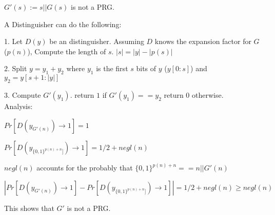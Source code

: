 \documentclass[12pt]{article}
\newenvironment{question}[2][Question]{\begin{trivlist}
		\item[\hskip \labelsep {\bfseries #1}\hskip \labelsep {\bfseries #2.}]}{\end{trivlist}}
\begin{document}
	\begin{question}{2a}
		$G'(s) := s||G(s)$ is not a PRG. 
		
		A Distinguisher can do the following:
		
		\hspace{\parindent} 1. Let $D(y)$ be an distinguisher. Assuming $D$ knows the expansion factor for $G$ ($p(n)$), Compute the length of $s$. $|s|=|y|-|p(s)|$
		
		\hspace{\parindent} 2. Split $y=y_1+y_2$ where $y_1$ is the first $s$ bits of $y$ ($y[0:s]$) and $y_2 = y[s+1:|y|]$ 
		
		\hspace{\parindent} 3. Compute $G'(y_1)$. return $1$ if $G'(y_1) == y_2$ return $0$ otherwise. \\
		
		
		Analysis:
		
		\hspace{\parindent} $Pr[D(y_{G'(n)})\rightarrow1] = 1$
		
		\hspace{\parindent} $Pr[D(y_{\{0,1\}^{p(n)+n}]})\rightarrow1] = 1/2 + negl(n)$
		
		\hspace{\parindent} $negl(n)$ accounts for the probably that $\{0,1\}^{p(n)+n} == n || G'(n)$
		
		\hspace{\parindent} $|Pr[D(y_{G'(n)})\rightarrow1] - Pr[D(y_{\{0,1\}^{p(n)+n}]})\rightarrow1]| = 1/2 + negl(n) \geq negl(n)$
		
		\hspace{\parindent} This shows that $G'$ is not a PRG. 
		
	\end{question}
	
\end{document}
